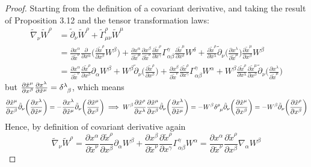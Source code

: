 \documentclass[a4paper]{article}
\theoremstyle{new}
\begin{document}
\begin{proof}
Starting from the definition of a covariant derivative, and taking the result of Proposition 3.12 and the tensor transformation laws:
\begin{align}
    \tilde{\nabla}_\nu\tilde{W}^\rho&=\tilde{\partial}_\nu\tilde{W}^\rho+\tilde{\Gamma}^\rho_{\mu\nu}\tilde{W}^\mu\nonumber\\&=\frac{\partial x^\alpha}{\partial\tilde{x}^\nu}\frac{\partial}{\partial x^\alpha}\bigg(\frac{\partial\tilde{x}^\rho}{\partial x^\beta}W^\beta\bigg)+\frac{\partial x^\alpha}{\partial\tilde{x}^\mu}\frac{\partial x^\beta}{\partial\tilde{x}^\nu}\frac{\partial\tilde{x}^\rho}{\partial x^\gamma}\Gamma^\gamma_{\alpha\beta}\frac{\partial\tilde{x}^\mu}{\partial x^\delta}W^\delta+\frac{\partial\tilde{x}^\rho}{\partial x^\lambda}\tilde{\partial}_\nu\bigg(\frac{\partial x^\lambda}{\partial\tilde{x}^\mu}\bigg)\frac{\partial\tilde{x}^\mu}{\partial x^\beta}W^\beta\nonumber\\&=\frac{\partial x^\alpha}{\partial\tilde{x}^\nu}\frac{\partial\tilde{x}^\rho}{\partial x^\beta}\partial_\alpha W^\beta+W^\beta\tilde{\partial}_\nu\bigg(\frac{\partial\tilde{x}^\rho}{\partial x^\beta}\bigg)+\frac{\partial x^\beta}{\partial\tilde{x}^\nu}\frac{\partial\tilde{x}^\rho}{\partial x^\gamma}\Gamma_{\alpha\beta}^\gamma W^\alpha+W^\beta\frac{\partial\tilde{x}^\rho}{\partial x^\lambda}\frac{\partial\tilde{x}^\mu}{\partial x^\beta}\tilde{\partial}_\nu\bigg(\frac{\partial x^\lambda}{\partial\tilde{x}^\mu}\bigg)\nonumber
\end{align}
but $\frac{\partial\tilde{x}^\mu}{\partial x^\beta}\frac{\partial x^\lambda}{\partial\tilde{x}^\mu}=\tensor*{\delta}{*_{}^{\lambda}_{\beta}}$, which means
$$\frac{\partial\tilde{x}^\mu}{\partial x^\beta}\tilde{\partial}_\nu\bigg(\frac{\partial x^\lambda}{\partial\tilde{x}^\mu}\bigg)=-\frac{\partial x^\lambda}{\partial\tilde{x}^\mu}\tilde{\partial}_\nu\bigg(\frac{\partial\tilde{x}^\mu}{\partial x^\beta}\bigg)\implies W^\beta\frac{\partial\tilde{x}^\rho}{\partial x^\lambda}\frac{\partial\tilde{x}^\mu}{\partial x^\beta}\tilde{\partial}_\nu\bigg(\frac{\partial x^\lambda}{\partial\tilde{x}^\mu}\bigg)=-W^\beta\tensor*{\delta}{*_{}^{\rho}_{\mu}}\tilde{\partial}_\nu\bigg(\frac{\partial\tilde{x}^\mu}{\partial x^\beta}\bigg)=-W^\beta\tilde{\partial}_\nu\bigg(\frac{\partial\tilde{x}^\rho}{\partial x^\beta}\bigg)$$
Hence, by definition of covariant derivative again
$$\tilde{\nabla}_\nu\tilde{W}^\rho=\frac{\partial x^\alpha}{\partial\tilde{x}^\nu}\frac{\partial\tilde{x}^\rho}{\partial x^\beta}\partial_\alpha W^\beta+\frac{\partial x^\beta}{\partial\tilde{x}^\nu}\frac{\partial\tilde{x}^\rho}{\partial x^\gamma}\Gamma_{\alpha\beta}^\gamma W^\alpha=\frac{\partial x^\alpha}{\partial\tilde{x}^\nu}\frac{\partial\tilde{x}^\rho}{\partial x^\beta}\nabla_\alpha W^\beta$$
\end{proof}
\end{document}
